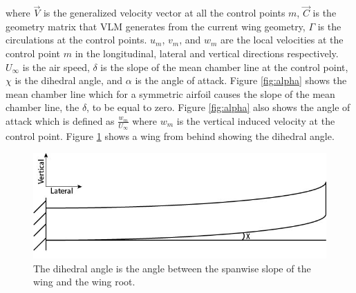 \documentclass[11pt]{ucthesis}
\begin{document}
where $\vec{V}$ is the generalized velocity vector at all the control points $m$, $\vec{C}$ is the geometry matrix that VLM generates from the current wing geometry, $\Gamma$ is the circulations at the control points. $u_m$, $v_m$, and $w_m$ are the local velocities at the control point $m$ in the longitudinal, lateral and vertical directions respectively. $U_{\infty}$ is the air speed, $\delta$ is the slope of the mean chamber line at the control point, $\chi$ is the dihedral angle, and $\alpha$ is the angle of attack. Figure \ref{fig:alpha} shows the mean chamber line which for a symmetric airfoil causes the slope of the mean chamber line, the $\delta$, to be equal to zero. Figure \ref{fig:alpha} also shows the angle of attack which is defined as $\frac{w_m}{U_{\infty}}$ where $w_m$ is the vertical induced velocity at the control point. Figure \ref{fig:dihedral} shows a wing from behind showing the dihedral angle.
\begin{figure}[h]
\centering
\includegraphics[width=0.5\linewidth]{Figures/DihedralAngle.jpg}
\caption{The dihedral angle is the angle between the spanwise slope of the wing and the wing root.}
\label{fig:dihedral}
\end{figure}
\end{document}
